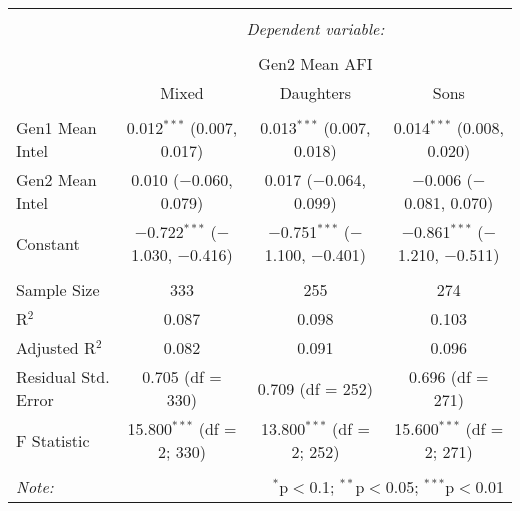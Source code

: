
\begingroup 
\small 
\begin{tabular}{@{\extracolsep{1pt}}lccc} 
\\[-1.8ex]\hline 
\hline \\[-1.8ex] 
 & \multicolumn{3}{c}{\textit{Dependent variable:}} \\ 
\cline{2-4} 
\\[-1.8ex] & \multicolumn{3}{c}{Gen2 Mean AFI} \\ 
 & Mixed & Daughters & Sons \\ 
\hline \\[-1.8ex] 
 Gen1 Mean Intel & 0.012$^{***}$ (0.007, 0.017) & 0.013$^{***}$ (0.007, 0.018) & 0.014$^{***}$ (0.008, 0.020) \\ 
  Gen2 Mean Intel & 0.010 ($-$0.060, 0.079) & 0.017 ($-$0.064, 0.099) & $-$0.006 ($-$0.081, 0.070) \\ 
  Constant & $-$0.722$^{***}$ ($-$1.030, $-$0.416) & $-$0.751$^{***}$ ($-$1.100, $-$0.401) & $-$0.861$^{***}$ ($-$1.210, $-$0.511) \\ 
 \hline \\[-1.8ex] 
Sample Size & 333 & 255 & 274 \\ 
R$^{2}$ & 0.087 & 0.098 & 0.103 \\ 
Adjusted R$^{2}$ & 0.082 & 0.091 & 0.096 \\ 
Residual Std. Error & 0.705 (df = 330) & 0.709 (df = 252) & 0.696 (df = 271) \\ 
F Statistic & 15.800$^{***}$ (df = 2; 330) & 13.800$^{***}$ (df = 2; 252) & 15.600$^{***}$ (df = 2; 271) \\ 
\hline 
\hline \\[-1.8ex] 
\textit{Note:}  & \multicolumn{3}{r}{$^{*}$p$<$0.1; $^{**}$p$<$0.05; $^{***}$p$<$0.01} \\ 
\end{tabular} 
\endgroup 
